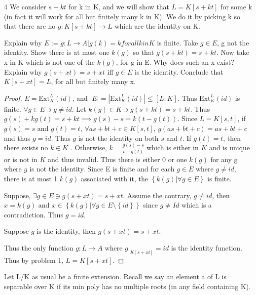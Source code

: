 \documentclass{article}
\begin{document}
\bigskip

\begin{PROB}{4}\label{Problem 4.}
    We consider $s + k t$ for k in K, and we will show that  $L = K[s + k t]$ for some k (in fact it will work for all but finitely many k in K). We do it by picking k so that there are no $g: K[s + k t] \to L$ which are the identity on K.

    Explain why $E:= {g: L \to A| g(k) = k for all k in K}$ is finite. Take $g \in E$, g not the identity. Show there is at most one $k(g)$ so that  $g(s + k t) = s + k t$.  Now take x in K which is not one of the $k(g)$, for g in E. Why does such an x exist?  Explain why $g(s + x t) = s + xt$ iff $g \in E$ is the identity. Conclude that  $K[s + xt] = L$, for all but finitely many x. 
\end{PROB}
\begin{proof}
    $E = \text{Ext}_{K}^{L}(id)$, and $|E| = |\text{Ext}_{K}^{L}(id)| \leq [L : K]$. Thus $\text{Ext}_{K}^{L}(id)$ is finite. $\forall g \in E \ni g \neq id$. Let $k(g)\in K \ni g(s + kt) = s + kt$. Thus $g(s) + kg(t) = s + kt \implies g(s) - s = k(t - g(t))$. Since $L = K[s, t]$, if $g(s) = s$ and $g(t) = t$, $\forall as + bt +c \in K[s, t]$, $g(as+ bt + c) = as +bt+c$ and thus $g = id$. Thus $g$ is not the identity on both $s$ and $t$. If $g(t) = t$, then there exists no $k \in K$ . Otherwise, $k = \frac{g(s) - s}{t - g(t)}$ which is either in $K$ and is unique or is not in $K$ and thus invalid. Thus there is either 0 or one $k(g)$ for any g where $g$ is not the identity. Since E is finite and for each $g \in E$ where $g \neq id$, there is at most 1 $k(g)$ associated with it, the $\left\{ k(g) | \forall g\in E \right\}$ is finite. 
    
    
    Suppose, $\exists g \in E \ni g(s + xt) = s + xt$. Assume the contrary, $g \neq id$, then $x = k(g)$ and $x \in \left\{ k(g) | \forall g\in E \setminus \left\{ id \right\} \right\}$ since $g \neq Id$ which is a contradiction. Thus $g = id$. 
    
    Suppose $g$ is the identity, then $g(s + xt) = s + xt$. 
    
    Thus the only function $g: L \to A$ where $g|_{K[s + xt]} = id$ is the identity function. Thus by problem 1, $L = K[s + xt]$.      
\end{proof}

\bigskip

Let L/K as usual be a finite extension. Recall we say an element a of L is separable over K if its min poly has no multiple roots (in any field containing K). 
\end{document}

